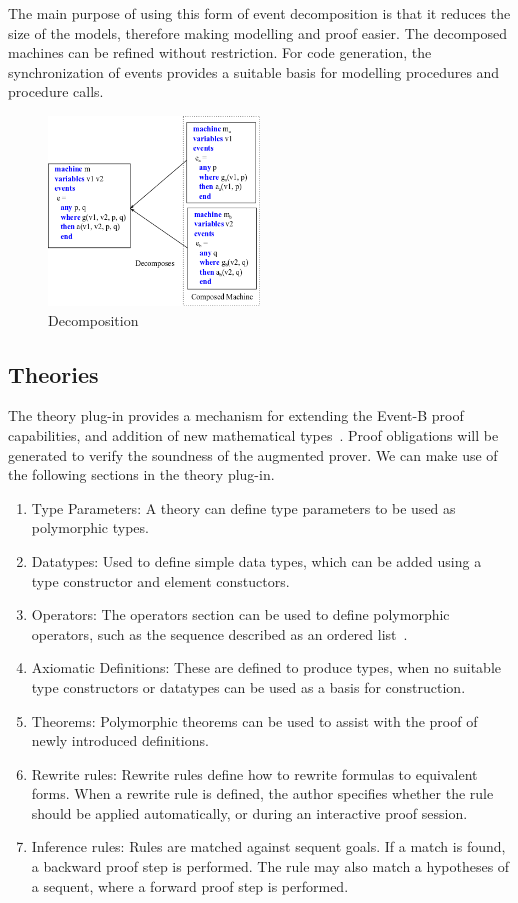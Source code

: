 The main purpose of using this form of event decomposition is that it reduces the size of the models, therefore making modelling and proof easier. The decomposed machines can be refined without restriction. For code generation, the synchronization of events provides a suitable basis for modelling procedures and procedure calls.
\begin{figure}
\centering
\includegraphics[width=0.5\textwidth]{graphics/Decomp2.png}
\caption{Decomposition}
\label{fig:decomp2}
\end{figure}
%
\subsection{Theories}
The theory plug-in provides a mechanism for extending the Event-B proof capabilities, and addition of new mathematical types~\cite{issamThesis}. Proof obligations will be generated to verify the soundness of the augmented prover. We can make use of the following sections in the theory plug-in.

\begin{enumerate}
\item Type Parameters: A theory can define type parameters to be used as polymorphic types.
\item Datatypes: Used to define simple data types, which can be added using a type constructor and element constuctors.
\item Operators: The operators section can be used to define polymorphic operators, such as the sequence described as an ordered list~\cite{issamThesis}. 
\item Axiomatic Definitions: These are defined to produce types, when no suitable type constructors or datatypes can be used as a basis for construction.
\item Theorems: Polymorphic theorems can be used to assist with the proof of newly introduced definitions. 
\item Rewrite rules: Rewrite rules define how to rewrite formulas to equivalent forms. When a rewrite rule is defined, the author specifies whether the rule should be applied automatically, or during an interactive proof session.
\item Inference rules: Rules are matched against sequent goals. If a match is found, a backward proof step is performed. The rule may also match a hypotheses of a sequent, where a forward proof step is performed.
\end{enumerate}


